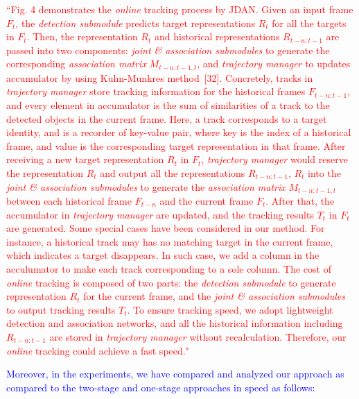 \documentclass[12pt,journal,onecolumn]{IEEEtran}
\begin{document}
\textcolor{red}{
``Fig. 4 demonstrates the \emph{online} tracking process by JDAN.
Given an input frame $F_t$, the \emph{detection submodule} predicts target representations $R_t$ for all the targets in $F_t$.
Then, the representation $R_t$ and historical representations $R_{t-n:t-1}$ are passed into two components: \emph{joint \& association submodules} to generate the corresponding \emph{association matrix} $M_{t-n:t-1,t}$, and \emph{trajectory manager} to updates accumulator by using Kuhn-Munkres method~[32]. 
Concretely, tracks in \emph{trajectory manager} store tracking information for the historical frames $F_{t-n:t-1}$, 
and every element in accumulator is the sum of similarities of a track to the detected objects in the current frame. 
Here, a track corresponds to a target identity, and is a recorder of key-value pair, where key is the index of a historical frame, and value is the corresponding target representation in that frame.
After receiving a new target representation $R_t$ in $F_t$, \emph{trajectory manager} would reserve the representation $R_t$ and output all the representations $R_{t-n:t-1}$, $R_t$ into the \emph{joint \& association submodules} to generate the \emph{association matrix} $M_{t-n:t-1,t}$ between each historical frame $F_{t-n}$ and the current frame $F_t$.
After that, the accumulator in \emph{trajectory manager} are updated, and the tracking results $T_t$ in $F_t$ are generated. Some special cases have been considered in our method.
For instance, a historical track may has no matching target in the current frame, which indicates a target disappears.
In such case, we add a column in the acculumator to make each track corresponding to a sole column.
% 
The cost of \emph{online} tracking is composed of two parts: 
the \emph{detection submodule} to generate representation $R_t$ for the current frame, and the \emph{joint \& association submodules} to output tracking results $T_t$.
To ensure tracking speed, we adopt lightweight detection and association networks, and all the historical information including $R_{t-n:t-1}$ are stored in \emph{trajectory manager} without recalculation.
Therefore, our \emph{online} tracking could achieve a fast speed." 
} 


\textcolor{blue}{
Moreover, in the experiments, we have compared and analyzed our approach as compared to the two-stage and one-stage approaches in speed as follows:
}
\end{document}
